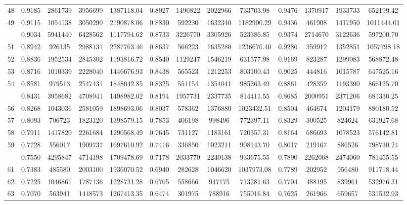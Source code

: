 \documentclass[
  12pt,
]{article}
\begin{document}
\begin{longtable}[t]{lcccccccccccc}
48 & 0.9185 & 2861739 & 3956699 & 1387118.04 & 0.8927 & 1490822 & 2022966 & 733703.98 & 0.9476 & 1370917 & 1933733 & 652199.42\\
49 & 0.9115 & 1054138 & 3050290 & 2190878.06 & 0.8830 & 592230 & 1632340 & 1182900.29 & 0.9436 & 461908 & 1417950 & 1011444.01\\
\addlinespace
50 & 0.9034 & 5941440 & 6428562 & 1117794.62 & 0.8733 & 3226770 & 3305926 & 523386.85 & 0.9374 & 2714670 & 3122636 & 597200.70\\
51 & 0.8942 & 926135 & 2988131 & 2287763.46 & 0.8637 & 566223 & 1635280 & 1236676.40 & 0.9286 & 359912 & 1352851 & 1057798.18\\
52 & 0.8836 & 1952534 & 2845302 & 1193816.72 & 0.8540 & 1129247 & 1546219 & 631577.98 & 0.9169 & 823287 & 1299083 & 568872.48\\
53 & 0.8716 & 1010339 & 2228040 & 1446676.93 & 0.8438 & 565523 & 1212253 & 803100.43 & 0.9025 & 444816 & 1015787 & 647525.16\\
54 & 0.8581 & 979513 & 2547431 & 1848042.85 & 0.8325 & 551154 & 1354041 & 985263.49 & 0.8861 & 428359 & 1193390 & 866125.70\\
\addlinespace
55 & 0.8431 & 3958682 & 4708941 & 1498982.02 & 0.8194 & 1957731 & 2337735 & 814411.55 & 0.8685 & 2000951 & 2371206 & 681330.25\\
56 & 0.8268 & 1043036 & 2581059 & 1898693.06 & 0.8037 & 578362 & 1376880 & 1023432.51 & 0.8504 & 464674 & 1204179 & 880180.52\\
57 & 0.8093 & 706723 & 1823120 & 1398579.15 & 0.7853 & 406198 & 998496 & 772397.11 & 0.8329 & 300525 & 824624 & 631927.68\\
58 & 0.7911 & 1417820 & 2261684 & 1290568.49 & 0.7645 & 731127 & 1183161 & 720357.31 & 0.8164 & 686693 & 1078523 & 576142.81\\
59 & 0.7728 & 556017 & 1909737 & 1697610.92 & 0.7416 & 336850 & 1023211 & 908143.70 & 0.8017 & 219167 & 886526 & 798730.24\\
\addlinespace
60 & 0.7550 & 4295847 & 4714198 & 1709478.69 & 0.7178 & 2033779 & 2240138 & 933675.55 & 0.7890 & 2262068 & 2474060 & 781455.55\\
61 & 0.7383 & 485580 & 2003100 & 1936070.52 & 0.6940 & 282628 & 1046620 & 1037973.08 & 0.7789 & 202952 & 956480 & 911718.44\\
62 & 0.7225 & 1046861 & 1787136 & 1228731.28 & 0.6705 & 558666 & 947175 & 713281.63 & 0.7704 & 488195 & 839961 & 532976.31\\
63 & 0.7070 & 563941 & 1448573 & 1267413.35 & 0.6474 & 301975 & 788916 & 755016.84 & 0.7625 & 261966 & 659657 & 531532.93\\

\end{longtable}
\end{document}
